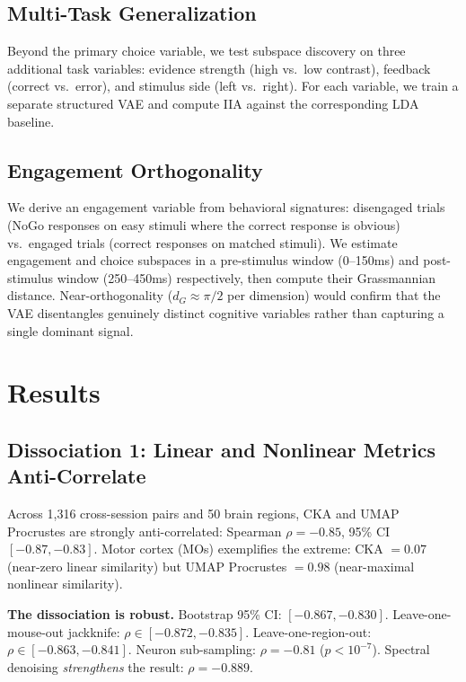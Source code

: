 \documentclass{article}
\begin{document}
\subsection{Multi-Task Generalization}

Beyond the primary choice variable, we test subspace discovery on three additional task variables: evidence strength (high vs.\ low contrast), feedback (correct vs.\ error), and stimulus side (left vs.\ right). For each variable, we train a separate structured VAE and compute IIA against the corresponding LDA baseline.

\subsection{Engagement Orthogonality}

We derive an engagement variable from behavioral signatures: disengaged trials (NoGo responses on easy stimuli where the correct response is obvious) vs.\ engaged trials (correct responses on matched stimuli). We estimate engagement and choice subspaces in a pre-stimulus window (0--150ms) and post-stimulus window (250--450ms) respectively, then compute their Grassmannian distance. Near-orthogonality ($d_G \approx \pi/2$ per dimension) would confirm that the VAE disentangles genuinely distinct cognitive variables rather than capturing a single dominant signal.

\section{Results}

\subsection{Dissociation 1: Linear and Nonlinear Metrics Anti-Correlate}

Across 1,316 cross-session pairs and 50 brain regions, CKA and UMAP Procrustes are strongly anti-correlated: Spearman $\rho = -0.85$, 95\% CI $[-0.87, -0.83]$. Motor cortex (MOs) exemplifies the extreme: CKA $= 0.07$ (near-zero linear similarity) but UMAP Procrustes $= 0.98$ (near-maximal nonlinear similarity).

\textbf{The dissociation is robust.} Bootstrap 95\% CI: $[-0.867, -0.830]$. Leave-one-mouse-out jackknife: $\rho \in [-0.872, -0.835]$. Leave-one-region-out: $\rho \in [-0.863, -0.841]$. Neuron sub-sampling: $\rho = -0.81$ ($p < 10^{-7}$). Spectral denoising \citep{spectral2025neurips} \emph{strengthens} the result: $\rho = -0.889$.
\end{document}
